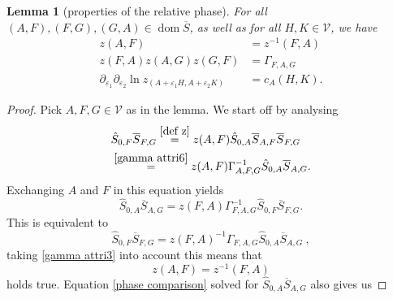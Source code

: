 \documentclass[b5paper,draft,openbib,12pt]{memoir}
\newtheorem{Lemma}[Def]{Lemma}
\DeclareMathOperator{\dom}{dom}
\begin{document}
\begin{Lemma}[properties of the relative phase]
For all \((A,F),(F,G),(G,A)\in\dom\overline{S}\), as well as for all \(H,K\in \mathcal{V}\), we have
\begin{align}\label{z antisym}
z(A,F)&=z^{-1}(F,A)\\\label{z gamma}
z(F,A)z(A,G)z(G,F)&=\Gamma_{F,A,G}\\\label{z c}
\partial_{\varepsilon_1}\partial_{\varepsilon_2}\ln  z_(A+\varepsilon_1 H,A+\varepsilon_2 K)&=c_A(H,K).
\end{align}
\end{Lemma}
\begin{proof}
Pick \(A,F,G\in\mathcal{V}\) as in the lemma. We start off by analysing
\begin{align}
&\hat{S}_{0,F}\overline{S}_{F,G}\overset{\eqref{def z}}{=}z(A,F)\hat{S}_{0,A}\overline{S}_{A,F}\overline{S}_{F,G}\\\label{phase comparison}
&\overset{\eqref{gamma attri6}}{=}z(A,F) \Gamma_{A,F,G}^{-1} \hat{S}_{0,A} \overline{S}_{A,G}.
\end{align}
Exchanging  \(A\) and \(F\) in this equation yields
\begin{equation}
\hat{S}_{0,A}\overline{S}_{A,G}=z(F,A) \Gamma_{F,A,G}^{-1} \hat{S}_{0,F} \overline{S}_{F,G}.
\end{equation}
This is equivalent to
\begin{equation}
\hat{S}_{0,F} \overline{S}_{F,G}=z(F,A)^{-1} \Gamma_{F,A,G} \hat{S}_{0,A}\overline{S}_{A,G}~,
\end{equation}
taking \eqref{gamma attri3} into account this means that 
\begin{equation}
z(A,F)=z^{-1}(F,A)
\end{equation}
holds true. Equation \eqref{phase comparison} solved for \(\hat{S}_{0,A}\overline{S}_{A,G}\) also gives us


\end{proof}
\end{document}
